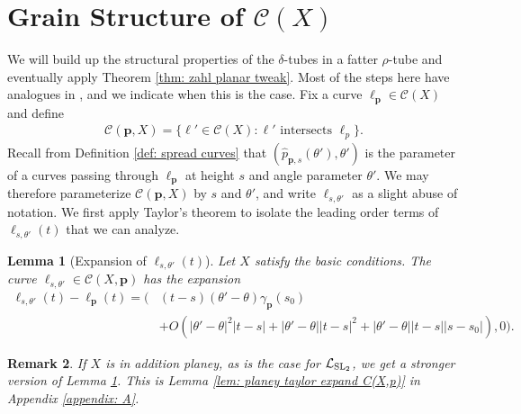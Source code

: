 \documentclass[12pt]{amsart}
\numberwithin{equation}{section}
\newtheorem{lemma}{Lemma}[section]
\newtheorem{remark}[lemma]{Remark}
\newcommand{\cC}{\mathcal C}
\renewcommand{\cC}{{\mathcal C}}
\newcommand{\1}{\mathbbm{1}}
\newcommand{\p}{\mathbf p}
\begin{document}
\section{Grain Structure of $\cC(X)$}\label{sec: 5}

We will build up the structural properties of the $\delta$-tubes in a fatter $\rho$-tube and eventually apply Theorem \ref{thm: zahl planar tweak}. Most of the steps here have analogues in \cite{KWZ}, and we indicate when this is the case.   
Fix a curve $\ell_\p \in \mathcal C(X)$ and define
\begin{align}
    \mathcal C(\p, X) = \{\ell' \in \mathcal C(X) : \ell' \text{ intersects } \ell_p \}.
\end{align}
Recall from  Definition \ref{def: spread curves} that $(\hat p_{\p, s}(\theta'), \theta')$ is the parameter of a curves passing through $\ell_{\p}$ at height $s$ and angle parameter $\theta'$. We may therefore parameterize $\mathcal C(\p, X)$ by $s$ and $\theta'$, and write $\ell_{s,\theta'}$ as a slight abuse of notation. We first apply Taylor's theorem to isolate the leading order terms of $\ell_{s,\theta'}(t)$ that we can analyze. 

\begin{lemma}[Expansion of $\ell_{s,\theta'}(t)$]\label{lem: taylor expand C(X,p)}
    Let $X$ satisfy the basic conditions. The curve $\ell_{s,\theta'} \in \mathcal C(X,\p)$ has the expansion 
    \begin{align} 
        \ell_{s, \theta'}(t) - \ell_{\p}(t) = (&(t-s)(\theta'-\theta)\gamma_\p(s_0) \\&+ O(|\theta'-\theta|^2 |t - s| + |\theta'-\theta| |t - s|^2 +|\theta'-\theta| |t -s| |s - s_0|),0). \nonumber 
    \end{align}
\end{lemma}

\begin{remark}
    If $X$ is in addition planey, as is the case for $\mathcal L_{\rm{SL}_2}$, we get a stronger version of Lemma \ref{lem: taylor expand C(X,p)}. This is Lemma \ref{lem: planey taylor expand C(X,p)} in Appendix \ref{appendix: A}. 
\end{remark}
\end{document}
